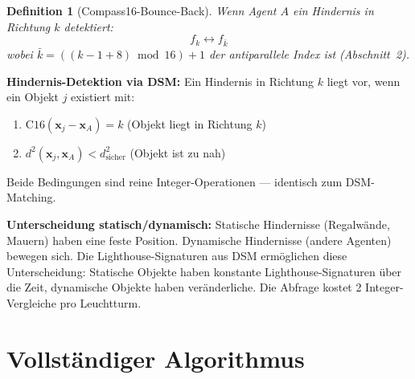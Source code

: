 \documentclass[11pt,a4paper]{article}
\newtheorem{definition}{Definition}
\newcommand{\compass}{\mathrm{C16}}
\begin{document}
\begin{definition}[Compass16-Bounce-Back]
Wenn Agent $A$ ein Hindernis in Richtung $k$ detektiert:
\begin{equation}
f_k \leftrightarrow f_{\bar{k}}
\end{equation}
wobei $\bar{k} = ((k-1+8) \bmod 16) + 1$ der antiparallele Index ist (Abschnitt~2).
\end{definition}

\textbf{Hindernis-Detektion via DSM:} Ein Hindernis in Richtung $k$ liegt vor, wenn
ein Objekt $j$ existiert mit:
\begin{enumerate}[itemsep=2pt]
\item $\compass(\mathbf{x}_j - \mathbf{x}_A) = k$ \quad (Objekt liegt in Richtung $k$)
\item $d^2(\mathbf{x}_j, \mathbf{x}_A) < d^2_{\mathrm{sicher}}$ \quad (Objekt ist zu nah)
\end{enumerate}
Beide Bedingungen sind reine Integer-Operationen --- identisch zum DSM-Matching.

\textbf{Unterscheidung statisch/dynamisch:}
Statische Hindernisse (Regalw\"ande, Mauern) haben eine feste Position.
Dynamische Hindernisse (andere Agenten) bewegen sich.
Die Lighthouse-Signaturen aus DSM erm\"oglichen diese Unterscheidung:
Statische Objekte haben konstante Lighthouse-Signaturen \"uber die Zeit,
dynamische Objekte haben ver\"anderliche. Die Abfrage kostet 2 Integer-Vergleiche pro Leuchtturm.

\section{Vollst\"andiger Algorithmus}
\end{document}
